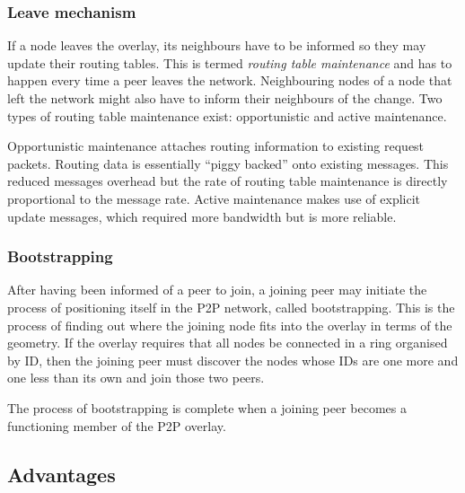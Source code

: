 \subsubsection{Leave mechanism}

If a node leaves the overlay, its neighbours have to be informed so they may update their routing tables. This is termed \emph{routing table maintenance} and has to happen every time a peer leaves the network. Neighbouring nodes of a node that left the network might also have to inform their neighbours of the change. Two types of routing table maintenance exist: opportunistic and active maintenance.

Opportunistic maintenance attaches routing information to existing request packets. Routing data is essentially ``piggy backed'' onto existing messages. This reduced messages overhead but the rate of routing table maintenance is directly proportional to the message rate. Active maintenance makes use of explicit update messages, which required more bandwidth but is more reliable.


\subsubsection{Bootstrapping}

After having been informed of a peer to join, a joining peer may initiate the process of positioning itself in the P2P network, called bootstrapping. This is the process of finding out where the joining node fits into the overlay in terms of the geometry. If the overlay requires that all nodes be connected in a ring organised by ID, then the joining peer must discover the nodes whose IDs are one more and one less than its own and join those two peers.

The process of bootstrapping is complete when a joining peer becomes a functioning member of the P2P overlay.


\subsection{Advantages}

